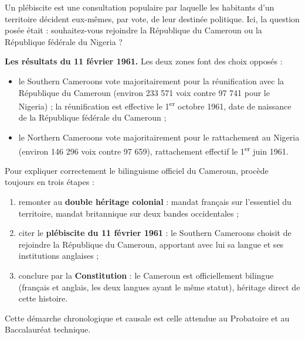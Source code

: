 \documentclass[11pt]{article}
\newcommand{\cle}[1]{{\popxbold\color{popdark}#1}}
\begin{document}
\begin{definition}[Plébiscite]
Un \cle{plébiscite} est une consultation populaire par laquelle les habitants d'un territoire décident eux-mêmes, par vote, de leur destinée politique. Ici, la question posée était : souhaitez-vous rejoindre la République du Cameroun ou la République fédérale du Nigeria ?
\end{definition}

\textbf{Les résultats du 11 février 1961.} Les deux zones font des choix opposés :
\begin{itemize}
\item le \cle{Southern Cameroons} vote majoritairement pour la réunification avec la République du Cameroun (environ 233 571 voix contre 97 741 pour le Nigeria) ; la réunification est effective le 1\textsuperscript{er} octobre 1961, date de naissance de la République fédérale du Cameroun ;
\item le \cle{Northern Cameroons} vote majoritairement pour le rattachement au Nigeria (environ 146 296 voix contre 97 659), rattachement effectif le 1\textsuperscript{er} juin 1961.
\end{itemize}

\begin{methode}
Pour expliquer correctement le bilinguisme officiel du Cameroun, procède toujours en trois étapes :
\begin{enumerate}
\item remonter au \textbf{double héritage colonial} : mandat français sur l'essentiel du territoire, mandat britannique sur deux bandes occidentales ;
\item citer le \textbf{plébiscite du 11 février 1961} : le Southern Cameroons choisit de rejoindre la République du Cameroun, apportant avec lui sa langue et ses institutions anglaises ;
\item conclure par la \textbf{Constitution} : le Cameroun est officiellement bilingue (français et anglais, les deux langues ayant le même statut), héritage direct de cette histoire.
\end{enumerate}
Cette démarche chronologique et causale est celle attendue au Probatoire et au Baccalauréat technique.
\end{methode}
\end{document}
